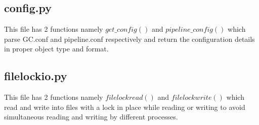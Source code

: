 \subsection{config.py}
This file has 2 functions namely $get\_config()$ and $pipeline\_config()$ which
parse GC.conf and pipeline.conf respectively and return the configuration
details in proper object type and format.


\subsection{filelockio.py}
This file has 2 functions namely $filelockread()$ and $filelockwrite()$ which read
and write into files with a lock in place while reading or writing to avoid
simultaneous reading and writing by different processes.


